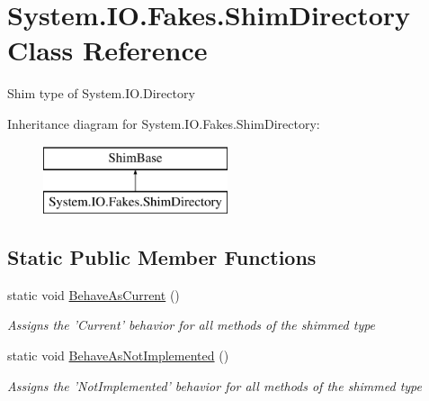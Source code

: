 \hypertarget{class_system_1_1_i_o_1_1_fakes_1_1_shim_directory}{\section{System.\-I\-O.\-Fakes.\-Shim\-Directory Class Reference}
\label{class_system_1_1_i_o_1_1_fakes_1_1_shim_directory}
}


Shim type of System.\-I\-O.\-Directory 


Inheritance diagram for System.\-I\-O.\-Fakes.\-Shim\-Directory\-:\begin{figure}[H]
\begin{center}
\leavevmode
\includegraphics[height=2.000000cm]{class_system_1_1_i_o_1_1_fakes_1_1_shim_directory}
\end{center}
\end{figure}
\subsection*{Static Public Member Functions}
\begin{DoxyCompactItemize}
\item 
static void \hyperlink{class_system_1_1_i_o_1_1_fakes_1_1_shim_directory_ad4db973bb082dc93213f68318f9bc10e}{Behave\-As\-Current} ()
\begin{DoxyCompactList}\small\item\em Assigns the 'Current' behavior for all methods of the shimmed type\end{DoxyCompactList}\item 
static void \hyperlink{class_system_1_1_i_o_1_1_fakes_1_1_shim_directory_a99facef4e567c522a40cd9a29487dd5a}{Behave\-As\-Not\-Implemented} ()
\begin{DoxyCompactList}\small\item\em Assigns the 'Not\-Implemented' behavior for all methods of the shimmed type\end{DoxyCompactList}\end{DoxyCompactItemize}
